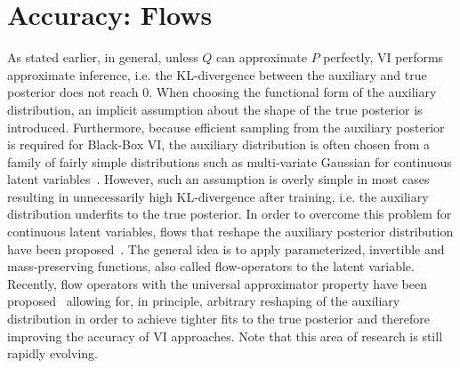 \documentclass[11pt]{cmuthesis} %
\begin{document}
\section{Accuracy: Flows}
As stated earlier, in general, unless $Q$ can approximate $P$ perfectly, VI performs approximate inference, i.e. the KL-divergence between the auxiliary and true posterior does not reach 0. When choosing the functional form of the auxiliary distribution, an implicit assumption about the shape of the true posterior is introduced. Furthermore, because efficient sampling from the auxiliary posterior is required for Black-Box VI, the auxiliary distribution is often chosen from a family of fairly simple distributions such as multi-variate Gaussian for continuous latent variables~\cite{kingma2013auto}. However, such an assumption is overly simple in most cases resulting in unnecessarily high KL-divergence after training, i.e. the auxiliary distribution underfits to the true posterior. In order to overcome this problem for continuous latent variables, flows that reshape the auxiliary posterior distribution have been proposed~\cite{rezende2015variational,kingma2016improved}. The general idea is to apply parameterized, invertible and mass-preserving functions, also called flow-operators to the latent variable. Recently, flow operators with the universal approximator property have been proposed~\cite{huang2018neural,grathwohl2018ffjord} allowing for, in principle, arbitrary reshaping of the auxiliary distribution in order to achieve tighter fits to the true posterior and therefore improving the accuracy of VI approaches. Note that this area of research is still rapidly evolving.
\end{document}
